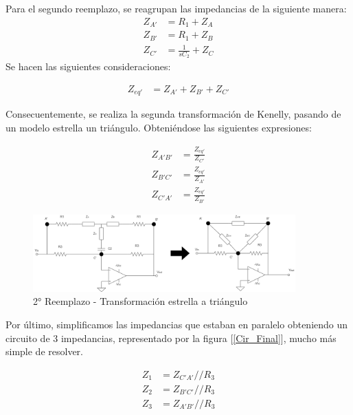 Para el segundo reemplazo, se reagrupan las impedancias
 de la siguiente manera:
 \vspace{2mm}
\begin{align}
		Z_{A'} &= R_1 + Z_{A} \\
		Z_{B'} &= R_1 + Z_{B} \\
		Z_{C'} &= \frac{1}{sC_2} + Z_{C}
\end{align}
\vspace{2mm}
Se hacen las 
siguientes consideraciones:

\begin{align*}
	Z_{eq'} &= Z_{A'} + Z_{B'} + Z_{C'}
\end{align*}
\vspace{2mm}

Consecuentemente, se realiza la segunda transformación de Kenelly, pasando 
de un modelo estrella un triángulo. Obteniéndose las siguientes expresiones:

\begin{align}
	Z_{A'B'} &= \frac{Z_{eq'}}{Z_{C'}} \\
	Z_{B'C'} &= \frac{Z_{eq'}}{Z_{A'}}  \\
	Z_{C'A'} &= \frac{Z_{eq'}}{Z_{B'}} 
\end{align}
\vspace{2mm}


\begin{figure}[H]
	\centering
	\includegraphics[width=0.9\textwidth]{../Ejercicio4-EcualizadorDeFase/Informe/2cambioTriangulo.png}
	\caption{2° Reemplazo - Transformación estrella a triángulo}
	\label{2reemplazo} 
\end{figure}

Por último, simplificamos las impedancias que estaban en paralelo obteniendo
 un circuito de 3 impedancias, representado por la figura
  [\ref{Cir_Final}], mucho más simple de resolver.

 \begin{align}
	Z_{1} & = Z_{C'A'}//R_3 \\
	Z_{2} & = Z_{B'C'}//R_3 \\ 
	Z_{3} & = Z_{A'B'}//R_3
\end{align} 
\vspace{2mm}

